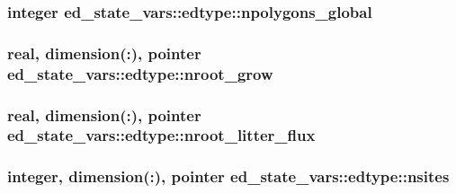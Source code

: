 \subsubsection[{\texorpdfstring{npolygons\+\_\+global}{npolygons_global}}]{\setlength{\rightskip}{0pt plus 5cm}integer ed\+\_\+state\+\_\+vars\+::edtype\+::npolygons\+\_\+global}\hypertarget{structed__state__vars_1_1edtype_a2c9a6eb0f55ef25763cf967357195ca2}{}\label{structed__state__vars_1_1edtype_a2c9a6eb0f55ef25763cf967357195ca2}
\subsubsection[{\texorpdfstring{nroot\+\_\+grow}{nroot_grow}}]{\setlength{\rightskip}{0pt plus 5cm}real, dimension(\+:), pointer ed\+\_\+state\+\_\+vars\+::edtype\+::nroot\+\_\+grow}\hypertarget{structed__state__vars_1_1edtype_abbe80b21dd5d8143eaedd139f38c7a0e}{}\label{structed__state__vars_1_1edtype_abbe80b21dd5d8143eaedd139f38c7a0e}
\subsubsection[{\texorpdfstring{nroot\+\_\+litter\+\_\+flux}{nroot_litter_flux}}]{\setlength{\rightskip}{0pt plus 5cm}real, dimension(\+:), pointer ed\+\_\+state\+\_\+vars\+::edtype\+::nroot\+\_\+litter\+\_\+flux}\hypertarget{structed__state__vars_1_1edtype_a5ab644b8e30b3e047d9731fbe7fe5b7e}{}\label{structed__state__vars_1_1edtype_a5ab644b8e30b3e047d9731fbe7fe5b7e}
\subsubsection[{\texorpdfstring{nsites}{nsites}}]{\setlength{\rightskip}{0pt plus 5cm}integer, dimension(\+:), pointer ed\+\_\+state\+\_\+vars\+::edtype\+::nsites}\hypertarget{structed__state__vars_1_1edtype_a1ed17b81dc6e7a00cae6e63804a4130e}{}\label{structed__state__vars_1_1edtype_a1ed17b81dc6e7a00cae6e63804a4130e}
